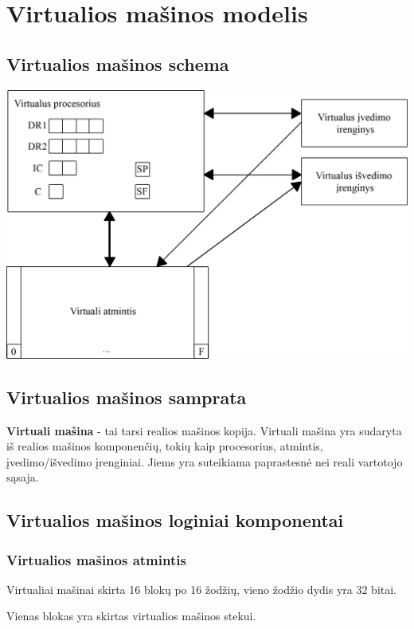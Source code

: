 \section{Virtualios mašinos modelis}
	\subsection{Virtualios mašinos schema}
	\includegraphics{VM.png}
	\subsection{Virtualios mašinos samprata}
	\textbf{Virtuali mašina} - tai tarsi realios mašinos kopija. Virtuali mašina yra sudaryta iš realios mašinos komponenčių, tokių kaip procesorius, atmintis, įvedimo/išvedimo įrenginiai. Jiems yra suteikiama paprastesnė nei reali vartotojo sąsaja.
	
	\subsection{Virtualios mašinos loginiai komponentai}
	\subsubsection{Virtualios mašinos atmintis}
	Virtualiai mašinai skirta 16 blokų po 16 žodžių, vieno žodžio dydis yra 32 bitai.
	
	Vienas blokas yra skirtas virtualios mašinos stekui.

